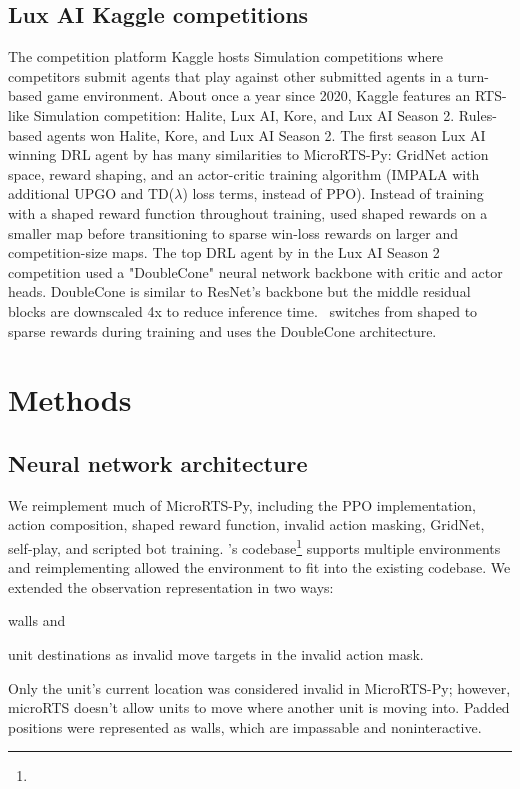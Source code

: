 \documentclass[conference]{IEEEtran}
\begin{document}
\subsection{Lux AI Kaggle competitions}
The competition platform Kaggle hosts Simulation competitions where competitors
submit agents that play against other submitted agents in a turn-based game
environment. About once a year since 2020, Kaggle features an RTS-like Simulation competition:
Halite, Lux AI, Kore, and Lux AI Season 2. Rules-based agents won Halite, Kore, and Lux
AI Season 2. The first season Lux AI winning DRL agent by \cite{lux-ai-2021-winner} 
has many similarities to MicroRTS-Py: GridNet action space, reward shaping, and an
actor-critic training algorithm (IMPALA with additional UPGO and TD($\lambda$) loss
terms, instead of PPO). Instead
of training with a shaped reward function throughout training, \cite{lux-ai-2021-winner}
used shaped rewards on a smaller map before transitioning to sparse win-loss rewards on
larger and competition-size maps. The top DRL agent by \cite{Ferdinand2021doublecone} in the Lux AI Season 2 competition used a "DoubleCone" neural
network backbone with critic and actor heads. DoubleCone is similar to ResNet's backbone but the 
middle residual blocks are downscaled 4x to reduce inference time.
\agentName\ switches from shaped to sparse rewards during training and uses the DoubleCone architecture.


\section{Methods}
\label{sec:methods}
\subsection{Neural network architecture}
We reimplement much of MicroRTS-Py, including the PPO implementation, action
composition, shaped reward function, invalid action masking, GridNet, self-play, and
scripted bot training. \agentName's codebase\footnote{\rlAlgoImplsGitHubUrl} supports 
multiple environments and reimplementing allowed the environment to fit into the 
existing codebase. We extended the observation representation in two ways:
\begin{inparaenum}[(1)]
    \item walls and
    \item unit destinations as invalid move targets in the invalid action mask.
\end{inparaenum}
Only the unit's current location was considered invalid in MicroRTS-Py; however, 
microRTS doesn't allow units to move where another unit is moving into.
Padded positions were represented as walls, which are impassable and noninteractive.
\end{document}
